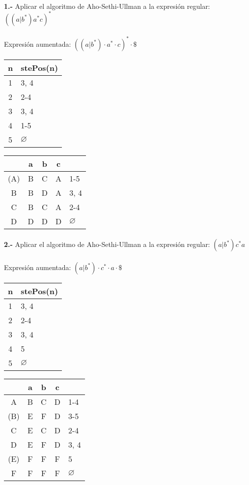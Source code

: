 \documentclass[11pt,a4paper]{report}
\begin{document}
\paragraph{}

\paragraph{}
\textbf{1.-} Aplicar el algoritmo de Aho-Sethi-Ullman a la expresión regular: \textbf{$ ((a|b^*)a^*c)^* $} \\
\\
Expresión aumentada: $ ((a|b^*)\cdot a^*\cdot c)^*\cdot \$  $ \\

\begin{tabular} {| c | l |}
\hline
n & stePos(n) \\ \hline
1 & 3, 4 \\ \hline
2 & 2-4 \\ \hline
3 & 3, 4 \\ \hline
4 & 1-5 \\ \hline
5 & $\varnothing$ \\ \hline
\end{tabular}
\quad
\begin{tabular} {| c | c |c |c | l |}
\hline 
& a & b & c & \\ \hline
(A) & B & C & A & 1-5\\ \hline
B & B & D & A & 3, 4\\ \hline
C & B & C & A & 2-4\\ \hline
D & D & D & D & $\varnothing$\\ \hline
\end{tabular}\paragraph{}
\textbf{2.-} Aplicar el algoritmo de Aho-Sethi-Ullman a la expresión regular: \textbf{$ (a|b^*)c^*a $} \\
\\
Expresión aumentada: $ (a|b^*)\cdot c^*\cdot a\cdot \$  $ \\

\begin{tabular} {| c | l |}
\hline
n & stePos(n) \\ \hline
1 & 3, 4 \\ \hline
2 & 2-4 \\ \hline
3 & 3, 4 \\ \hline
4 & 5 \\ \hline
5 & $\varnothing$ \\ \hline
\end{tabular}
\quad
\begin{tabular} {| c | c |c |c | l |}
\hline 
& a & b & c & \\ \hline
A & B & C & D & 1-4\\ \hline
(B) & E & F & D & 3-5\\ \hline
C & E & C & D & 2-4\\ \hline
D & E & F & D & 3, 4\\ \hline
(E) & F & F & F & 5\\ \hline
F & F & F & F & $\varnothing$\\ \hline
\end{tabular}
\end{document}
